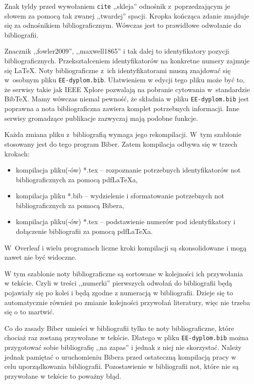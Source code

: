 Znak tyldy przed wywołaniem \texttt{cite} ,,skleja'' odnośnik z~poprzedzającym je słowem za pomocą tak zwanej ,,twardej'' spacji. Kropka kończąca zdanie znajduje się za odnośnikiem bibliograficznym. Wówczas jest to prawidłowe odwołanie do bibliografii.

Znacznik ,,fowler2009'', ,,maxwell1865'' i tak dalej to identyfikatory pozycji bibliograficznych. Przekształceniem identyfikatorów na konkretne numery zajmuje się \LaTeX{}. Noty bibliograficzne z~ich identyfikatorami muszą znajdować się w~osobnym pliku \texttt{EE-dyplom.bib}. Ułatwieniem w edycji tego pliku może być to, że serwisy takie jak IEEE Xplore pozwalają na pobranie cytowania w~standardzie BibTeX. Mamy wówczas niemal pewność, że składnia w pliku \texttt{EE-dyplom.bib} jest poprawna a nota bibliograficzna zawiera komplet potrzebnych informacji. Inne serwisy gromadzące publikacje zazwyczaj mają podobne funkcje.

Każda zmiana pliku z~bibliografią wymaga jego rekompilacji. W~tym szablonie stosowany jest do tego program Biber. Zatem kompilacja odbywa się w trzech krokach:
\begin{itemize}
	\item kompilacja pliku(-ów) *.tex -- rozpoznanie potrzebnych identyfikatorów not bibliograficznych za pomocą pdf\LaTeX{a},
	\item kompilacja pliku *.bib -- wydzielenie i sformatowanie potrzebnych not bibliograficznych za pomocą Bibera,
	\item kompilacja pliku(-ów) *.tex -- podstawienie numerów pod identyfikatory i dołączenie bibliografii za pomocą pdf\LaTeX{a}.
\end{itemize}
W~Overleaf i wielu programach liczne kroki kompilacji są skonsolidowane i mogą nawet nie być widoczne. 

W tym szablonie noty bibliograficzne są sortowane w kolejności ich przywołania w tekście. Czyli w treści ,,numerki'' pierwszych odwołań do bibliografii będą pojawiały się po kolei i będą zgodne z numeracją w bibliografii. Dzieje się to automatycznie również po zmianie kolejności przywołań literatury, więc nie trzeba się o to martwić.

Co do zasady Biber umieści w bibliografii tylko te noty bibliograficzne, które chociaż raz zostaną przywołane w tekście. Dlatego w pliku \texttt{EE-dyplom.bib} można przygotować sobie bibliografię ,,na zapas'' i jednak z niej nie skorzystać. Należy jednak pamiętać o uruchomieniu Bibera przed ostateczną kompilacją pracy w celu uporządkowania bibliografii. Pozostawienie w bibliografii not, które nie są przywołane w tekście to poważny błąd.
